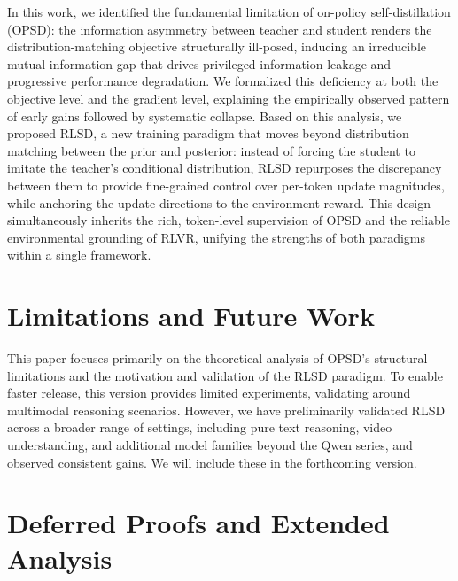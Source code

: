 \documentclass[]{jingdong}
\begin{document}
In this work, we identified the fundamental limitation of on-policy self-distillation (OPSD): the information asymmetry between teacher and student renders the distribution-matching objective structurally ill-posed, inducing an irreducible mutual information gap that drives privileged information leakage and progressive performance degradation. We formalized this deficiency at both the objective level and the gradient level, explaining the empirically observed pattern of early gains followed by systematic collapse.
Based on this analysis, we proposed RLSD, a new training paradigm that moves beyond distribution matching between the prior and posterior: instead of forcing the student to imitate the teacher's conditional distribution, RLSD repurposes the discrepancy between them to provide fine-grained control over per-token update magnitudes, while anchoring the update directions to the environment reward. This design simultaneously inherits the rich, token-level supervision of OPSD and the reliable environmental grounding of RLVR, unifying the strengths of both paradigms within a single framework. 





\section{Limitations and Future Work}
This paper focuses primarily on the theoretical analysis of OPSD's structural limitations and the motivation and validation of the RLSD paradigm. To enable faster release, this version provides limited experiments, validating around multimodal reasoning scenarios. However, we have preliminarily validated RLSD across a broader range of settings, including pure text reasoning, video understanding, and additional model families beyond the Qwen series, and observed consistent gains. We will include these in the forthcoming version.






\appendix

\section{Deferred Proofs and Extended Analysis}
\label{app:deferred-proofs}
\end{document}
